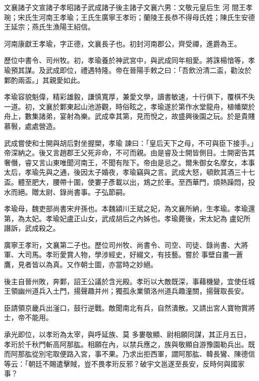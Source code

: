 
\begin{pinyinscope}

 文襄諸子文宣諸子孝昭諸子武成諸子後主諸子文襄六男：文敬元皇后生
 河
 間王孝琬；宋氏生河南王孝瑜；王氏生廣寧王孝珩；蘭陵王長恭不得母氏姓；陳氏生安德王延宗；燕氏生漁陽王紹信。



 河南康獻王孝瑜，字正德，文襄長子也。初封河南郡公，齊受禪，進爵為王。



 歷位中書令、司州牧。初，孝瑜養於神武宮中，與武成同年相愛。將誅楊愔等，孝瑜預其謀。及武成即位，禮遇特隆。帝在晉陽手敕之曰：「吾飲汾清二盃，勸汝於鄴酌兩盃。」其親愛如此。



 孝瑜容貌魁偉，精彩雄毅，謙慎寬厚，兼愛文學，讀書敏速，十行俱下，覆棋不失一道。初，文襄於鄴東起山池游觀，時俗眩之，孝瑜遂於第作水堂龍舟，植幡槊於舟上，數集諸弟，宴射為樂。武成幸其第，見而悅之，故盛興後園之玩。於是貴賤慕斅，處處營造。



 武成嘗使和士開與胡后對坐握槊，孝瑜
 諫曰：「皇后天下之母，不可與臣下接手。」帝深納之。後又言趙郡王父死非命，不可而親。由是睿及士開皆側目。士開密告其奢僭，睿又言山東唯聞河南王，不聞有陛下。帝由是忌之。爾朱御女名摩女，本事太后，孝瑜先與之通，後因太子婚夜，孝瑜竊與之言。武成大怒，頓飲其酒三十七盃。體至肥大，腰帶十圍，使婁子彥載以出，鴆之於車。至西華門，煩熱躁悶，投水而絕。贈太尉、錄尚書事。子弘節嗣。



 孝瑜母，魏吏部尚書宋弁孫也。本魏潁川王斌之妃，為文襄所納，生孝瑜。孝瑜還第，為太妃。孝瑜妃盧正山女，武成胡后之內姊也。孝瑜薨後，宋太妃為
 盧妃所譖訴，武成殺之。



 廣寧王孝珩，文襄第二子也。歷位司州牧、尚書令、司空、司徒、錄尚書、大將軍、大司馬。孝珩愛賞人物，學涉經史，好綴文，有技藝。嘗於事壁自畫一蒼鷹，見者皆以為真。又作朝士圖，亦當時之妙絕。



 後主自晉州敗，奔鄴，詔王公議於含光殿。孝珩以大敵既深，事藉機變，宜使任城王領幽州道兵入土門，揚聲趣并州；獨孤永業領洛州道兵趣潼關，揚聲取長安。



 臣請領京畿兵出滏口，鼓行逆戰。敵聞南北有兵，自然潰散。又請出宮人寶物賞將士，帝不能用。



 承光即位，以孝珩為太宰，與呼延族、莫
 多婁敬顯、尉相願同謀，其正月五日，孝珩於千秋門斬高阿那肱。相願在內，以禁兵應之，族與敬顯自游豫園勒兵出。既而阿那肱從別宅取便路入宮，事不果。乃求出拒西軍，謂阿那肱、韓長鸞、陳德信等云：「朝廷不賜遣擊賊，豈不畏孝珩反邪？破宇文邕遂至長安，反時何與國家事？




\end{pinyinscope}
